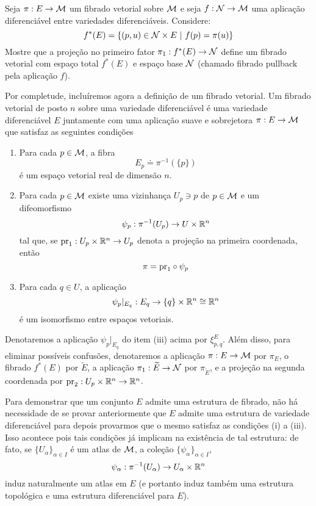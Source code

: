 \begin{Mybox}
Seja $\pi: E \to \mathcal{M}$ um fibrado vetorial sobre $\mathcal{M}$ e seja $f: \mathcal{N} \to \mathcal{M}$ uma aplicação diferenciável entre variedades diferenciáveis. Considere:
\[
f^{*}(E) = \{(p, u) \in \nn \times E \ \vert \ f(p) = \pi(u) \}
\]
Mostre que a projeção no primeiro fator $\pi_1: f^{*}(E) \to \mathcal{N}$ define um fibrado vetorial com espaço total $f^{*}(E)$ e espaço base $\mathcal{N}$ (chamado fibrado pullback pela aplicação $f$).
\vspace{-.4cm}
\end{Mybox}
\vspace{-.4cm}

\begin{oobs}
Por completude, incluíremos agora a definição de um fibrado vetorial. Um fibrado vetorial de posto $n$ sobre uma variedade diferenciável é uma variedade diferenciável $E$ juntamente com uma aplicação suave e sobrejetora $\pi: E \to \mathcal{M}$ que satisfaz as seguintes condições
\begin{enumerate}
\item Para cada $p \in \mathcal{M}$, a fibra
\[
E_p \doteq \pi^{-1}(\{p\})
\]
é um espaço vetorial real de dimensão $n$.
\item Para cada $p \in \mathcal{M}$ existe uma vizinhança $U_p \ni p$ de $p \in \mathcal{M}$ e um difeomorfismo 
\[
\psi_p: \pi^{-1}(U_p) \to  U \times \mathbb{R}^n
\]
tal que, se $\text{pr}_1 : U_p \times \mathbb{R}^n \to U_p$ denota a projeção na primeira coordenada, então 
\[
\pi = \text{pr}_1 \circ \psi_p
\]
\item Para cada $q \in U$, a aplicação
\[
\psi_p\vert_{E_q} : E_q \to \{q \} \times \mathbb{R}^n \cong \mathbb{R}^n
\] 
é um isomorfismo entre espaços vetoriais.
\end{enumerate}
\begin{oobs}
Denotaremos a aplicação $\psi_p\vert_{E_q}$ do item (iii) acima por $\xi^E_{p, q}$. Além disso, para eliminar possíveis confusões, denotaremos a aplicação $\pi: E \to \mathcal{M}$ por $\pi_E$, o fibrado $f^{*}(E)$ por $\widetilde{E}$, a aplicação $\pi_1: \widetilde{E} \to \mathcal{N} $ por $\pi_{\widetilde{E}}$, e a projeção na segunda coordenada por $\text{pr}_2 : U_p \times \mathbb{R}^n \to \mathbb{R}^n$.
\end{oobs}
\end{oobs}

\begin{oobs}
Para demonstrar que um conjunto $E$ admite uma estrutura de fibrado, não há necessidade de se provar anteriormente que $E$ admite uma estrutura de variedade diferenciável para depois provarmos que o mesmo satisfaz as condições (i) a (iii). Isso acontece pois tais condições já implicam na existência de tal estrutura: de fato, se $\{U_{\alpha} \}_{\alpha \in I}$ é um atlas de $\mathcal{M}$, a coleção $\{\psi_{\alpha} \}_{\alpha \in I}$,
\[
\psi_{\alpha} : \pi^{-1}(U_{\alpha}) \to U_{\alpha} \times \mathbb{R}^n
\]
induz naturalmente um atlas em $E$ (e portanto induz também uma estrutura topológica e uma estrutura diferenciável para $E$). 
\end{oobs}

